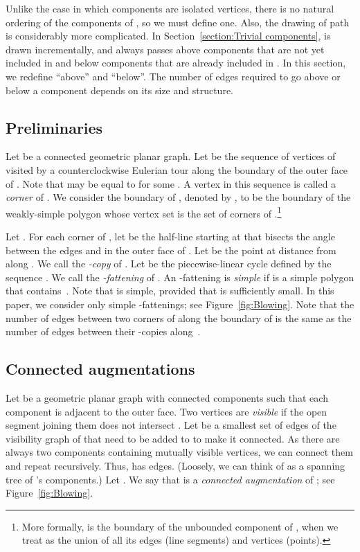 \documentclass[11pt]{patmorin}
\begin{document}
Unlike the case in which
components are isolated vertices, there is no natural ordering of the
components of , so we must define one. Also, the drawing
of path  is considerably more complicated.  In Section~\ref{section:Trivial components},  is drawn incrementally, and always passes above components that are not yet included in  and below components that are already included in .  In this section, we redefine ``above'' and ``below''. The number of edges required to go above or below a component depends on its size and structure.

\subsection{Preliminaries}\label{section:Preliminaries} 
Let  be a connected geometric planar graph. Let  be the sequence of vertices of  visited by a counterclockwise
Eulerian tour along the boundary of the outer face of . Note that
 may be equal to  for some .  A vertex 
in this sequence is called a \emph{corner} of .  We consider the boundary of , denoted by , to be the
boundary of the weakly-simple polygon  whose
vertex set is the set of corners of .\footnote{More formally,  is the boundary of the unbounded component of , when we treat  as the union of all its edges (line segments) and vertices (points).}

Let . For each corner  of , let  be the half-line starting at  that bisects the angle between the edges  and  in the outer face of . Let  be the point at distance  from  along . We call  the \emph{-copy} of . Let  be the piecewise-linear cycle defined by the sequence . We call  the \emph{-fattening} of .
An -fattening  is \emph{simple} if   is a simple polygon that contains~.
Note that  is simple, provided that  is sufficiently small. In this paper, we consider only simple -fattenings; see Figure~\ref{fig:Blowing}. Note that the number of edges between two corners of  along the boundary of  is the same as the number of edges between their -copies along~.

\subsection{Connected augmentations}\label{section: connected augmentations}
Let  be a geometric planar graph with  connected components such that each component is adjacent to the outer face.
Two vertices are {\em visible} if the open segment joining them does not intersect .
Let  be a smallest set of edges of the visibility graph of  that need to be added to  to make it connected.
As there are always two components containing mutually visible vertices, we can connect them and repeat recursively.  Thus,  has  edges. (Loosely, we can think of  as a spanning tree of 's components.) Let .  We say that  is a \emph{connected augmentation} of ; see Figure~\ref{fig:Blowing}.
\end{document}
